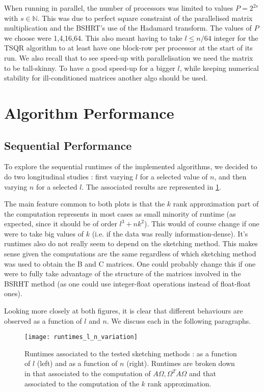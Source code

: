 \documentclass[a4paper, 12pt,oneside]{article}
\begin{document}
		When running in parallel, the number of processors was limited to values $P=2^{2s}$ with $s\in\mathbb{N}$. This was due to perfect square constraint of the parallelised matrix multiplication and the BSHRT's use of the Hadamard transform. The values of $P$ we choose were 1,4,16,64. 		
		This also meant having to take $l\le n/64$ integer for the TSQR algorithm to at least have one block-row per processor at the start of its run. We also recall that to see speed-up with parallelisation we need the matrix to be tall-skinny. To have a good speed-up for a bigger $l$, while keeping numerical stability for ill-conditioned matrices another algo should be used.
	\section{Algorithm Performance}
        \subsection{Sequential Performance}
		To explore the sequential runtimes of the implemented algorithms, we decided to do two longitudinal studies : first varying $l$ for a selected value of $n$, and then varying $n$ for a selected $l$. The associated results are represented in \ref{fig:runtimes-l-n-variation}. 

		The main feature common to both plots is that the $k$ rank approximation part of the computation represents in most cases as small minority of runtime (as expected, since it should be of order $l^3 +nk^2$). This would of course change if one were to take big values of $k$ (i.e. if the data was really information-dense).  	
		It's runtimes also do not really seem to depend on the sketching method. This makes sense given the computations are the same regardless of which sketching method was used to obtain the B and C matrices. One could probably change this if one were to fully take advantage of the structure of the matrices involved in the BSRHT method (as one could use integer-float operations instead of float-float ones). 

		Looking more closely at both figures, it is clear that different behaviours are observed as a function of $l$ and $n$. We discuss each in the following paragraphs.
		\begin{figure}[htb]       
			\centering             
				\vspace{0em}
				\texttt{[image: runtimes\_l\_n\_variation]}
				\caption{Runtimes associated to the tested sketching methods : as a function of $l$ (left) and as a function of $n$ (right). Runtimes are broken down in that associated to the computation of $A\Omega,\Omega^T A\Omega$ and that associated to the computation of the $k$ rank approximation.}
				\label{fig:runtimes-l-n-variation}
		\end{figure}
\end{document}
